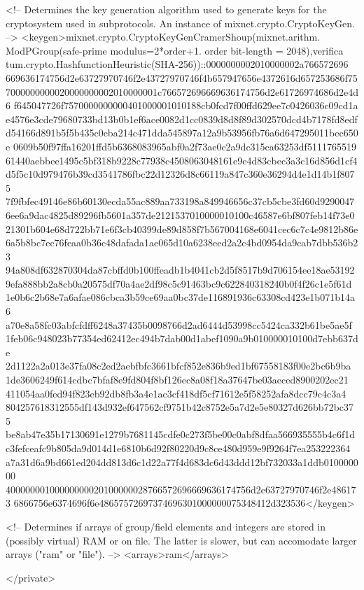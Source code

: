    <!-- Determines the key generation algorithm used to generate keys 
        for the cryptosystem used in subprotocols. An instance of 
        mixnet.crypto.CryptoKeyGen. -->
   <keygen>mixnet.crypto.CryptoKeyGenCramerShoup(mixnet.arithm.
ModPGroup(safe-prime modulus=2*order+1. order bit-length = 2048),verifica
tum.crypto.HashfunctionHeuristic(SHA-256))::0000000002010000002a766572696
669636174756d2e63727970746f2e43727970746f4b657947656e4372616d657253686f75
7000000000020000000002010000001c766572696669636174756d2e61726974686d2e4d6
f645047726f7570000000000401000001010188cb0fcd7f00ffd629ee7c0426036c09cd1a
e4576e3cde79680733bd13b0b1ef6ace0082d1cc0839d8d8f89d302570dcd4b7178fd8edf
d54166d891b5f5b435c0cba214c471dda545897a12a9b53956fb76a6d647295011bec650e
0609b50f97ffa16201ffd5b6368083965abf0a2f73ae0c2a9dc315ca63253df5111765519
61440aebbee1495c5bf318b9228c77938c4508063048161e9e4d83cbec3a3c16d856d1cf4
d5f5c10d979476b39cd3541786fbc22d12326d8c66119a847c360e36294d4e1d14b1f8075
7f9fbfec49146e86b60130ecda55ac889aa733198a849946656c37cb5cbe3fd60d9290047
6ee6a9dac4825d89296fb5601a357de2121537010000010100c46587e6bf807feb14f73e0
21301b604e68d722bb71e6f3cb40399de89d858f7b567004168e6041cec6c7c4e9812b86e
6a5b8bc7ec76feaa0b36c48dafada1ae065d10a6238eed2a2c4bd0954da9cab7dbb536b23
94a808df632870304da87cbffd0b100ffeadb1b4041cb2d5f8517b9d706154ee18ae53192
9efa888bb2a8cb0a20575df70a4ae2df98c5c91463bc9c622840318240b0f4f26c1e5f61d
1e0b6c2b68e7a6afae086cbca3b59ce69aa0bc37de116891936c63308cd423e1b071b14a6
a70e8a58fc03abfcfdff6248a37435b0098766d2ad6444d53998cc5424ca332b61be5ae5f
1feb06c948023b77354ed62412ec494b7dab00d1abef1090a9b010000010100d7ebb637de
2d1122a2a013e37fa08c2ed2aebfbfc3661bfcf852e836b9ed1bf67558183f00e2bc6b9ba
1de3606249f614cdbc7bfaf8e9fd804f8bf126ec8a08f18a37647be03aeced8900202ec21
411054aa0fed94f823eb92db8fb3a4e1ac3cf418df5cf71612e5f58252afa8dcc79c4c3a4
804257618312555df143d932ef647562cf9751b42c8752e5a7d2e5e80327d626bb72bc375
be8ab47e35b17130691e1279b7681145cdfe0c273f5be00c0abf8dfaa566935555b4c6f1d
c3fefceafc9b805da9d014d1e6810b6d92f80220d9c8ce480d959e9f9264f7ea253222364
a7a31d6a9bd661ed204dd813d6c1d22a77f4d683dc6d43ddd12bf732033a1ddb010000000
40000000100000000020100000028766572696669636174756d2e63727970746f2e486173
6866756e6374696f6e48657572697374696301000000075348412d323536</keygen>

   <!-- Determines if arrays of group/field elements and integers are 
        stored in (possibly virtual) RAM or on file. The latter is 
        slower, but can accomodate larger arrays ("ram" or "file"). -->
   <arrays>ram</arrays>

</private>


